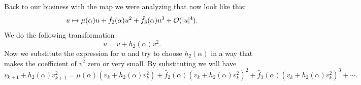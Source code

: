 Back to our business with the map we were analyzing that now look like this:
\[ u \mapsto \mu(\alpha)u + \hat{f}_2(\alpha)u^2 + \hat{f}_3(\alpha)u^3 + \mathcal{O}(|u|^4). \]
We do the following transformation
\[ u = v + h_2(\alpha) v^2. \]
Now we substitute the expression for $u$ and try to choose $h_2(\alpha)$ in a way that makes the coefficient of $v^2$ zero or very small. By substituting we will have
\[ v_{k+1} + h_2(\alpha)v_{k+1}^2 = \mu(\alpha)(v_k+h_2(\alpha)v_k^2) + \hat{f}_2(\alpha)(v_k+h_2(\alpha)v_k^2)^2 + \hat{f}_3(\alpha)(v_k+h_2(\alpha)v_k^2)^3 + \cdots. \]